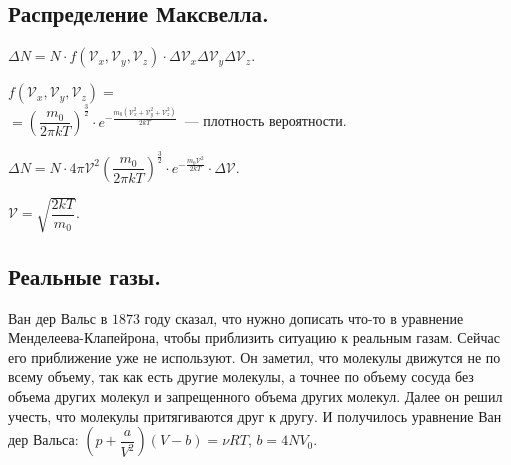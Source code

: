\documentclass[12pt]{article}
\begin{document}
	\subsection{Распределение Максвелла.}
	\begin{definition}
		$\varDelta N = N \cdot f(\mathcal{V}_x, \mathcal{V}_y, \mathcal{V}_z) \cdot \varDelta \mathcal{V}_x \varDelta \mathcal{V}_y \varDelta \mathcal{V}_z$.
	\end{definition}
	\begin{definition}
		$f(\mathcal{V}_x, \mathcal{V}_y, \mathcal{V}_z) =$ \\
		$= \left( \dfrac{m_0}{2 \pi kT} \right)^{\frac{3}{2}} \cdot e^{- \frac{m_0(\mathcal{V}_x^2 + \mathcal{V}_y^2 + \mathcal{V}_z^2)}{2kT}}$~--- плотность вероятности.
	\end{definition}
	\begin{definition}
		$\varDelta N = N \cdot 4 \pi \mathcal{V}^2 \left( \dfrac{m_0}{2 \pi kT} \right)^{\frac{3}{2}} \cdot e^{- \frac{m_0\mathcal{V}^2}{2kT}} \cdot \varDelta \mathcal{V}$.
	\end{definition}
	\begin{definition}
		$\mathcal{V} = \sqrt{\dfrac{2kT}{m_0}}$.
	\end{definition}
	\subsection{Реальные газы.}
	\begin{definition}
		Ван дер Вальс в $1873$ году сказал, что нужно дописать что-то в уравнение Менделеева-Клапейрона, чтобы приблизить ситуацию к реальным газам. Сейчас его приближение уже не используют. Он заметил, что молекулы движутся не по всему объему, так как есть другие молекулы, а точнее по объему сосуда без объема других молекул и запрещенного объема других молекул. Далее он решил учесть, что молекулы притягиваются друг к другу. И получилось уравнение Ван дер Вальса: $(p + \dfrac{a}{V^2})(V - b) = \nu RT$, $b = 4NV_0$.
	\end{definition}
\end{document}
